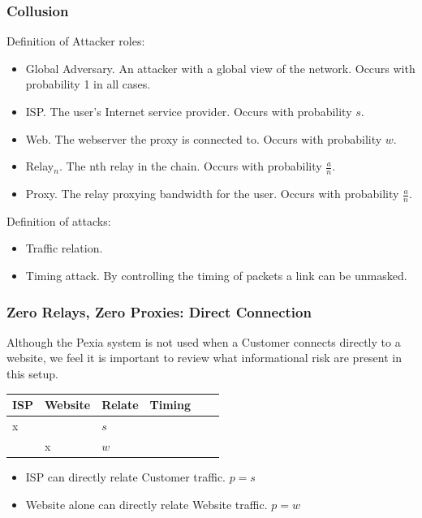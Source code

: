 \documentclass{article}
\newcommand{\mesh}{Pexia}
\newcommand{\Pexia}{\mesh}
\begin{document}
\subsubsection{Collusion}

Definition of Attacker roles:

\begin{itemize}
\item Global Adversary. An attacker with a global view of the network. Occurs with probability 1 in all cases.
\item ISP. The user's Internet service provider. Occurs with probability $s$.
\item Web. The webserver the proxy is connected to. Occurs with probability $w$.
\item Relay$_n$. The nth relay in the chain. Occurs with probability $\frac{a}{n}$.
\item Proxy. The relay proxying bandwidth for the user. Occurs with probability $\frac{a}{n}$.
\end{itemize}

Definition of attacks:

\begin{itemize}
\item Traffic relation.
\item Timing attack. By controlling the timing of packets a link can be unmasked.
\end{itemize}

\subsubsection{Zero Relays, Zero Proxies: Direct Connection}

Although the \Pexia{} system is not used when a Customer connects directly to a website, we feel it is important to review what informational risk are present in this setup.

\begin{center}
\begin{tabular}{l | l | l | l | l | l}
  ISP & Website & Relate             & Timing \\
  \hline
  x   &         & $s$                & \\
  \hline
      & x       & $w$                & \\
\end{tabular}
\end{center}

\begin{itemize}
\item ISP can directly relate Customer traffic. $p = s$
\item Website alone can directly relate Website traffic. $p = w$
\end{itemize}
\end{document}
